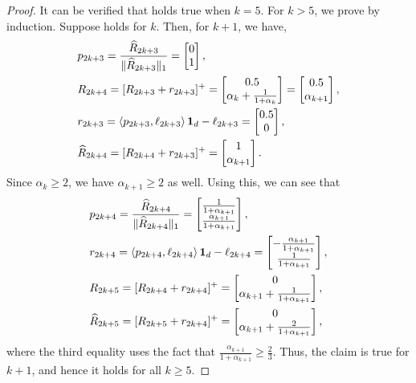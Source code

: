 \begin{proof}
It can be verified that  holds true when $k=5$. For $k>5$, we prove by induction. Suppose  holds for $k$. Then, for $k+1$, we have,
\begin{align*}
    &{p}_{2k+3} =\frac{\widehat{R}_{2k+3}}{\lVert\widehat{R}_{2k+3}\rVert_1} =\begin{bmatrix}
        0\\ 1
    \end{bmatrix},  \\
    &R_{2k+4} = [R_{2k+3}+r_{2k+3}]^+ = \begin{bmatrix}
        0.5\\
        \alpha_k+\frac{1}{1+\alpha_k}
    \end{bmatrix} =
    \begin{bmatrix}
        0.5\\
        \alpha_{k+1}
    \end{bmatrix},
    \\
    &r_{2k+3} = \left\langle {p_{2k+3},\ell_{2k+3}} \right\rangle\mathbf{1}_d - \ell_{2k+3} = \begin{bmatrix}
        0.5\\
        0
    \end{bmatrix},\\
    &\widehat{R}_{2k+4} = [R_{2k+4}+r_{2k+3}]^+ = 
    \begin{bmatrix}
        1\\
        \alpha_{k+1} 
    \end{bmatrix}.
\end{align*}
Since $\alpha_k\ge 2$, we have $\alpha_{k+1}\ge 2$ as well. Using this, we can see that
\begin{align*}
    &{p}_{2k+4} =
    \frac{\widehat{R}_{2k+4}}{\|\widehat{R}_{2k+4}\|_1} = 
    \begin{bmatrix}
         \frac{1}{1+\alpha_{k+1}}\\
         \frac{\alpha_{k+1}}{1+\alpha_{k+1}}
    \end{bmatrix}, \\
    &r_{2k+4} = \left\langle {p_{2k+4},\ell_{2k+4}} \right\rangle\mathbf{1}_d - \ell_{2k+4} = \begin{bmatrix}
        -\frac{\alpha_{k+1}}{1+\alpha_{k+1}}\\
        \frac{1}{1+\alpha_{k+1}}
    \end{bmatrix}, \\
    &R_{2k+5} = [R_{2k+4}+r_{2k+4}]^+ = 
    \begin{bmatrix}
        0\\
        \alpha_{k+1}+\frac{1}{1+\alpha_{k+1}}
    \end{bmatrix}, \\
    &\widehat{R}_{2k+5} = [R_{2k+5}+r_{2k+4}]^+ = 
    \begin{bmatrix}
        0\\
        \alpha_{k+1}+\frac{2}{1+\alpha_{k+1}}
    \end{bmatrix},
\end{align*}
where the third equality uses the fact that $\frac{\alpha_{k+1}}{1+\alpha_{k+1}}\geq \frac{2}{3}$. Thus, the claim is true for $k+1$, and hence it holds for all $k\ge 5$.
\end{proof}